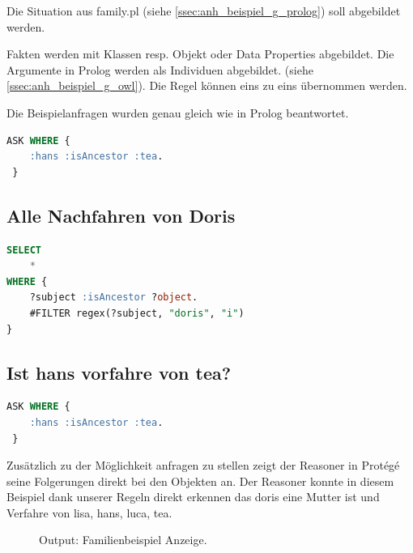 Die Situation aus family.pl (siehe \ref{ssec:anh_beispiel_g_prolog}) soll abgebildet werden.


Fakten werden mit Klassen resp. Objekt oder Data Properties abgebildet. Die Argumente in Prolog werden als Individuen abgebildet. (siehe \ref{ssec:anh_beispiel_g_owl}).
Die Regel können eins zu eins übernommen werden.

Die Beispielanfragen wurden genau gleich wie in Prolog beantwortet. 

\begin{lstlisting}[caption={Familienbeispiel in Prolog},captionpos=b,language=SQL]
ASK WHERE {
  	:hans :isAncestor :tea.
 }
\end{lstlisting}

\subsection{Alle Nachfahren von Doris}
\label{ssec:anh_beispiel_g_1}
\begin{lstlisting}[caption={Alle Nachfahren von Doris},captionpos=b,language=SQL]
SELECT
	*
WHERE {
	?subject :isAncestor ?object.
  	#FILTER regex(?subject, "doris", "i")
}
\end{lstlisting}

\subsection{Ist hans vorfahre von tea?}
\label{ssec:anh_beispiel_g_2}
\begin{lstlisting}[caption={Ist hans vorfahre von tea?},captionpos=b,language=SQL]
ASK WHERE {
  	:hans :isAncestor :tea.
 }
\end{lstlisting}

Zusätzlich zu der Möglichkeit anfragen zu stellen zeigt der Reasoner in Protégé seine Folgerungen direkt bei den Objekten an. Der Reasoner konnte in diesem Beispiel dank unserer Regeln direkt erkennen das doris eine Mutter ist und Verfahre von lisa, hans, luca, tea.

\begin{figure}[H]
\centering {}
\caption{Output: Familienbeispiel Anzeige.\label{fig:family}\protect\footnotemark}
\end{figure}


